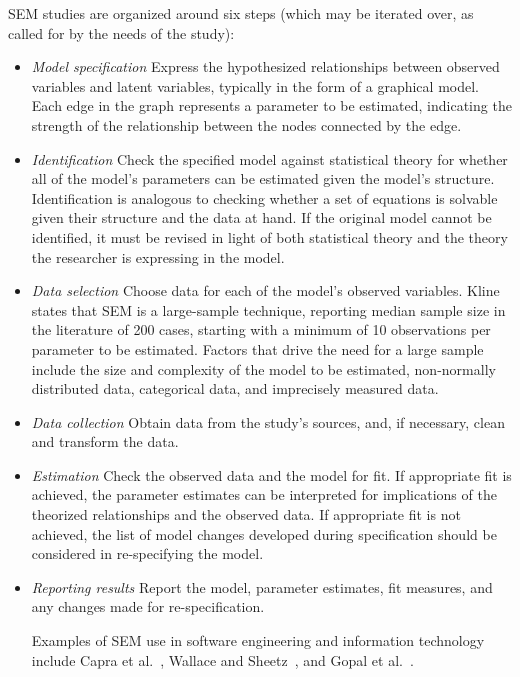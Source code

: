 SEM studies are organized around six steps (which may be iterated over, as called for by the needs of the study): 
\begin{itemize}
\item \textit{Model specification} Express the hypothesized relationships between observed variables and latent variables, typically in the form of a graphical model. Each edge in the graph represents a parameter to be estimated, indicating the strength of the relationship between the nodes connected by the edge.

\item \textit{Identification} 
Check the specified model against statistical theory for whether all of the model’s parameters can be estimated given the model's structure. Identification is analogous to checking whether a set of equations is solvable given their structure and the data at hand. If the original model cannot be identified, it must be revised in light of both statistical theory and the theory the researcher is expressing in the model.

\item \textit{Data selection}
Choose data for each of the model’s observed variables. Kline ~\cite{kline2015principles} states that SEM is a large-sample technique, reporting median sample size in the literature of 200 cases, starting with a minimum of 10 observations per parameter to be estimated.  Factors that drive the need for a large sample include the size and complexity of the model to be estimated, non-normally distributed data, categorical data, and imprecisely measured data.

\item \textit{Data collection}
Obtain data from the study's sources, and, if necessary, clean and transform the data.

\item \textit{Estimation}
Check the observed data and the model for fit.  If appropriate fit is achieved, the parameter estimates can be interpreted for implications of the theorized relationships and the observed data. If appropriate fit is not achieved, the list of model changes developed during specification should be considered in re-specifying the model.

\item \textit{Reporting results}
Report the model, parameter estimates,  fit measures, and any changes made for re-specification.

Examples of SEM use in software engineering and information technology include Capra et al.~\cite{capra2008empirical}, Wallace and Sheetz~\cite{wallace2014adoption}, and Gopal et al.~\cite{gopal2005impact}.
\end{itemize}

